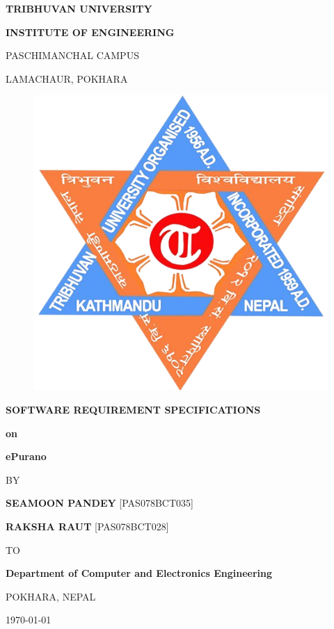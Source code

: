 \begin{titlepage}
    \thispagestyle{empty}
    \begin{center}
    
    \vspace*{\fill} %
    {\large \textbf{TRIBHUVAN UNIVERSITY
}\par}
{\large \textbf{INSTITUTE OF ENGINEERING
}\par}
\vspace{8pt}
PASCHIMANCHAL CAMPUS

LAMACHAUR, POKHARA
\vspace{24pt}

\begin{figure}[ht]
    \centering
    \includegraphics[scale=0.25]{../images/ioe-logo.png}
\end{figure}
\vspace{24pt}
{\textbf{SOFTWARE REQUIREMENT SPECIFICATIONS}\par \textbf{on} \par}
\vspace{14pt}
{\textbf{ ePurano }\par}

\vspace{14pt}
{BY\par}
\vspace{14pt}
    
{\textbf{SEAMOON PANDEY} [PAS078BCT035]\par}
{\textbf{RAKSHA RAUT} [PAS078BCT028]\par}

\vspace{24pt}
{TO\par}
\vspace{14pt}
{\textbf{Department of Computer and
Electronics Engineering}\par}
{POKHARA, NEPAL\par}
\today
    \vspace*{\fill}

    \end{center}
\end{titlepage}